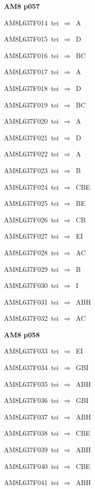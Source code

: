 \par\vfill\eject
{\bf\hfill AM8 p057\hfill\hbox{}}\par\bigskip
{\sixrm AM8L637F014\ {\sixit tei}\ }$\Rightarrow$\ A\par\smallskip
{\sixrm AM8L637F015\ {\sixit tei}\ }$\Rightarrow$\ D\par\smallskip
{\sixrm AM8L637F016\ {\sixit tei}\ }$\Rightarrow$\ BC\par\smallskip
{\sixrm AM8L637F017\ {\sixit tei}\ }$\Rightarrow$\ A\par\smallskip
{\sixrm AM8L637F018\ {\sixit tei}\ }$\Rightarrow$\ D\par\smallskip
{\sixrm AM8L637F019\ {\sixit tei}\ }$\Rightarrow$\ BC\par\smallskip
{\sixrm AM8L637F020\ {\sixit tei}\ }$\Rightarrow$\ A\par\smallskip
{\sixrm AM8L637F021\ {\sixit tei}\ }$\Rightarrow$\ D\par\smallskip
{\sixrm AM8L637F022\ {\sixit tei}\ }$\Rightarrow$\ A\par\smallskip
{\sixrm AM8L637F023\ {\sixit tei}\ }$\Rightarrow$\ B\par\smallskip
{\sixrm AM8L637F024\ {\sixit tei}\ }$\Rightarrow$\ CBE\par\smallskip
{\sixrm AM8L637F025\ {\sixit tei}\ }$\Rightarrow$\ BE\par\smallskip
{\sixrm AM8L637F026\ {\sixit tei}\ }$\Rightarrow$\ CB\par\smallskip
{\sixrm AM8L637F027\ {\sixit tei}\ }$\Rightarrow$\ EI\par\smallskip
{\sixrm AM8L637F028\ {\sixit tei}\ }$\Rightarrow$\ AC\par\smallskip
{\sixrm AM8L637F029\ {\sixit tei}\ }$\Rightarrow$\ B\par\smallskip
{\sixrm AM8L637F030\ {\sixit tei}\ }$\Rightarrow$\ I\par\smallskip
{\sixrm AM8L637F031\ {\sixit tei}\ }$\Rightarrow$\ ABH\par\smallskip
{\sixrm AM8L637F032\ {\sixit tei}\ }$\Rightarrow$\ AC\par\smallskip

\par\vfill\eject
{\bf\hfill AM8 p058\hfill\hbox{}}\par\bigskip
{\sixrm AM8L637F033\ {\sixit tei}\ }$\Rightarrow$\ EI\par\smallskip
{\sixrm AM8L637F034\ {\sixit tei}\ }$\Rightarrow$\ GBI\par\smallskip
{\sixrm AM8L637F035\ {\sixit tei}\ }$\Rightarrow$\ ABH\par\smallskip
{\sixrm AM8L637F036\ {\sixit tei}\ }$\Rightarrow$\ GBI\par\smallskip
{\sixrm AM8L637F037\ {\sixit tei}\ }$\Rightarrow$\ ABH\par\smallskip
{\sixrm AM8L637F038\ {\sixit tei}\ }$\Rightarrow$\ CBE\par\smallskip
{\sixrm AM8L637F039\ {\sixit tei}\ }$\Rightarrow$\ ABH\par\smallskip
{\sixrm AM8L637F040\ {\sixit tei}\ }$\Rightarrow$\ CBE\par\smallskip
{\sixrm AM8L637F041\ {\sixit tei}\ }$\Rightarrow$\ ABH\par\smallskip

